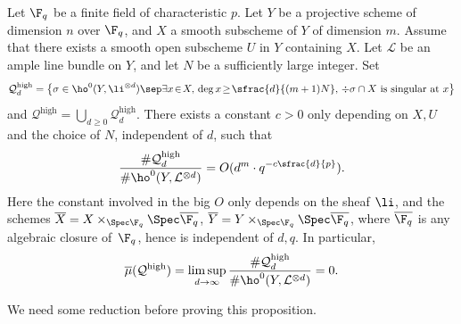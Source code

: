 \begin{prop}\label{hifinite}
Let $\F_q$ be a finite field of characteristic $p$. Let $Y$ be a projective scheme of dimension $n$ over $\F_q$, and $X$ a smooth subscheme of $Y$ of dimension $m$. Assume that there exists a smooth open subscheme $U$ in $Y$ containing $X$. Let $\mathcal{L}$ be an ample line bundle on $Y$, and let $N$ be a sufficiently large integer.
Set\vspace*{-3pt}
\[
\mathcal{Q}_{d}^{\mathrm{high}}= \bigl\{ \sigma\in \ho^0(Y,\li^{\otimes d})\sep \exists x\!\in\!X,\, \deg x\!\geq\! \sfrac{d}{(m+1)N},\,\div \sigma\cap X \text{ is singular at }x \bigl\}
\]
and $\mathcal{Q}^{\mathrm{high}}=\bigcup_{d\geq 0}\mathcal{Q}_{d}^{\mathrm{high}}$.
There exists a constant $c>0$ only depending on $X,U$ and the choice of $N$, independent of $d$, such that\vspace*{-3pt}\enlargethispage{\baselineskip}
\[
\frac{ \#\mathcal{Q}_d^{\mathrm{high}}}{\# \ho^0(Y, \mathcal{L}^{\otimes d})}=O(d^{m}\cdot q^{-c\sfrac{d}{p}}).
\]
Here the constant involved in the big $O$ only depends on the sheaf $\li$, and the schemes $\overline{X}=X\times_{\Spec \F_q}\Spec \overline{\F_q}$, $\overline{Y}=Y\times_{\Spec \F_q}\Spec \overline{\F_q}$, where $\overline{\F_q}$ is any algebraic closure of~$\F_q$, hence is independent of $d,q$.
In particular,\vspace*{-3pt}
\[
\overline{\mu}(\mathcal{Q}^{\mathrm{high}})=\limsup_{d\to \infty} \frac{ \#\mathcal{Q}_d^{\mathrm{high}}}{\# \ho^0(Y, \mathcal{L}^{\otimes d})}=0.
\]
\end{prop}

We need some reduction before proving this proposition.

